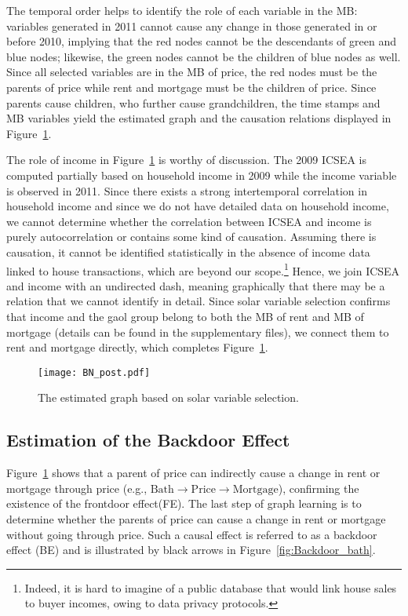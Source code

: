 \documentclass[11pt,review,authoryear]{elsarticle}
\begin{document}
The temporal order helps to identify the role of each variable in the MB: variables generated in 2011 cannot cause any change in those generated in or before 2010, implying that the red nodes cannot be the descendants of green and blue nodes; likewise, the green nodes cannot be the children of blue nodes as well. Since all selected variables are in the MB of price, the red nodes must be the parents of price while rent and mortgage must be the children of price. Since parents cause children, who further cause grandchildren, the time stamps and MB variables yield the estimated graph and the causation relations displayed in Figure~\ref{fig:BN_post}.

The role of income in Figure~\ref{fig:BN_post} is worthy of discussion. The 2009 ICSEA is computed partially based on household income in 2009 while the income variable is observed in 2011. Since there exists a strong intertemporal correlation in household income and since we do not have detailed data on household income, we cannot determine whether the correlation between ICSEA and income is purely autocorrelation or contains some kind of causation. Assuming there is causation, it cannot be identified statistically in the absence of income data linked to house transactions, which are beyond our scope.\footnote{Indeed, it is hard to imagine of a public database that would link house sales to buyer incomes, owing to data privacy protocols.} Hence, we join ICSEA and income with an undirected dash, meaning graphically that there may be a relation that we cannot identify in detail. Since solar variable selection confirms that income and the gaol group belong to both the MB of rent and MB of mortgage (details can be found in the supplementary files), we connect them to rent and mortgage directly, which completes Figure~\ref{fig:BN_post}.

\begin{figure}[h]
  \centering
  \texttt{[image: BN\_post.pdf]}
  \caption{The estimated graph based on solar variable selection.}
  \label{fig:BN_post}
\end{figure}

\subsection{Estimation of the Backdoor Effect}

Figure~\ref{fig:BN_post} shows that a parent of price can indirectly cause a change in rent or mortgage through price (e.g., $\mathrm{Bath} \rightarrow \mathrm{Price} \rightarrow \mathrm{Mortgage}$), confirming the existence of the frontdoor effect(FE). The last step of graph learning is to determine whether the parents of price can cause a change in rent or mortgage without going through price. Such a causal effect is referred to as a backdoor effect (BE) and is illustrated by black arrows in Figure~\ref{fig:Backdoor_bath}.
\end{document}
